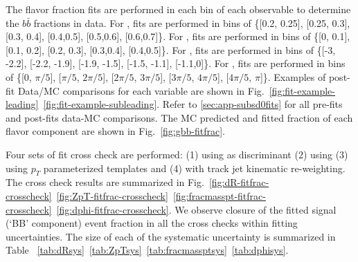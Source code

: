 \label{sec:gbb-bkgres}

The flavor fraction fits are performed in each bin of each observable to determine the $b\bar b $ fractions in data. For \drbb, fits are performed in bins of \{[0.2, 0.25], [0.25, 0.3], [0.3, 0.4], [0.4,0.5], [0.5,0.6], [0.6,0.7]\}. For \zpt, fits are performed in bins of \{[0, 0.1], [0.1, 0.2], [0.2, 0.3], [0.3,0.4], [0.4,0.5]\}. For \mpt, fits are performed in bins of \{[-3, -2.2], [-2.2, -1.9], [-1.9, -1.5], [-1.5, -1.1], [-1.1,0]\}. For \dphi, fits are performed in bins of \{[0, $\pi/5$], [$\pi/5$, $2\pi/5$], [$2\pi/5$, $3\pi/5$], [$3\pi/5$, $4\pi/5$], [$4\pi/5$, $\pi$]\}. Examples of post-fit Data/MC comparisons for each variable are shown in Fig.~\ref{fig:fit-example-leading}~\ref{fig:fit-example-subleading}. Refer to \ref{sec:app-subsd0fits} for all pre-fits and post-fits data-MC comparisons. The MC predicted and fitted fraction of each flavor component are shown in Fig.~\ref{fig:gbb-fitfrac}.

Four sets of fit cross check are performed: (1) using \sdzero as discriminant (2) using \subsubsdzero (3) using $p_T$ parameterized templates and (4) with track jet kinematic re-weighting. The cross check results are summarized in Fig.~\ref{fig:dR-fitfrac-crosscheck}~\ref{fig:ZpT-fitfrac-crosscheck}~\ref{fig:fracmasspt-fitfrac-crosscheck}~\ref{fig:dphi-fitfrac-crosscheck}. We observe closure of the fitted signal (`BB' component) event fraction in all the cross checks within fitting uncertainties. The size of each of the systematic uncertainty is summarized in Table ~\ref{tab:dRsys}~\ref{tab:ZpTsys}~\ref{tab:fracmassptsys}~\ref{tab:dphisys}.

